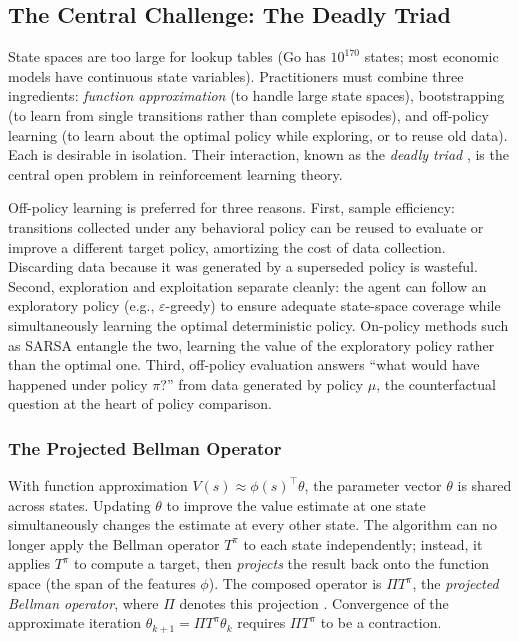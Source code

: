 \subsection{The Central Challenge: The Deadly Triad}
\label{sec:deadly_triad}

State spaces are too large for lookup tables (Go has $10^{170}$ states; most economic models have continuous state variables). Practitioners must combine three ingredients: \textit{function approximation} (to handle large state spaces), bootstrapping (to learn from single transitions rather than complete episodes), and off-policy learning (to learn about the optimal policy while exploring, or to reuse old data). Each is desirable in isolation. Their interaction, known as the \emph{deadly triad} \citep[Ch.~11]{sutton2018}, is the central open problem in reinforcement learning theory.

Off-policy learning is preferred for three reasons. First, sample efficiency: transitions collected under any behavioral policy can be reused to evaluate or improve a different target policy, amortizing the cost of data collection. Discarding data because it was generated by a superseded policy is wasteful. Second, exploration and exploitation separate cleanly: the agent can follow an exploratory policy (e.g., $\varepsilon$-greedy) to ensure adequate state-space coverage while simultaneously learning the optimal deterministic policy. On-policy methods such as SARSA entangle the two, learning the value of the exploratory policy rather than the optimal one. Third, off-policy evaluation answers ``what would have happened under policy $\pi$?'' from data generated by policy $\mu$, the counterfactual question at the heart of policy comparison.

\subsubsection{The Projected Bellman Operator}

With function approximation $V(s) \approx \phi(s)^\top \theta$, the parameter vector $\theta$ is shared across states. Updating $\theta$ to improve the value estimate at one state simultaneously changes the estimate at every other state. The algorithm can no longer apply the Bellman operator $T^\pi$ to each state independently; instead, it applies $T^\pi$ to compute a target, then \emph{projects} the result back onto the function space (the span of the features $\phi$). The composed operator is $\Pi T^\pi$, the \textit{projected Bellman operator}, where $\Pi$ denotes this projection \citep{tsitsiklis1997}. Convergence of the approximate iteration $\theta_{k+1} = \Pi T^\pi \theta_k$ requires $\Pi T^\pi$ to be a contraction.

